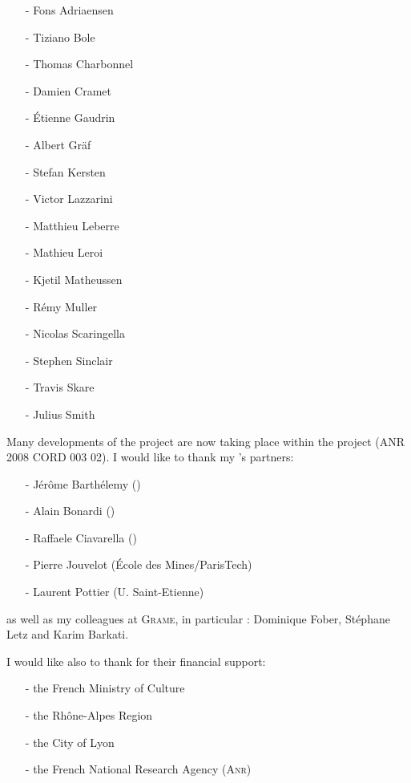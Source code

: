 \documentclass[a4paper,10pt]{book}
\begin{document}
\begin{itemize}

\item[-]Fons Adriaensen	
\item[-]Tiziano Bole	
\item[-]Thomas Charbonnel
\item[-]Damien Cramet
\item[-]\'Etienne Gaudrin
\item[-]Albert Gr\"af
\item[-]Stefan Kersten
\item[-]Victor Lazzarini
\item[-]Matthieu Leberre
\item[-]Mathieu Leroi
\item[-]Kjetil Matheussen
\item[-]R\'emy Muller
\item[-]Nicolas Scaringella
\item[-]Stephen Sinclair
\item[-]Travis Skare
\item[-]Julius Smith
\end{itemize}


Many developments of the \faust project are now taking place within the \astree project (ANR 2008 CORD 003 02). I would like to thank my \astree's partners:
\begin{itemize}
\item[-]J\'er\^ome Barth\'elemy (\ircam)
\item[-]Alain Bonardi (\ircam)
\item[-]Raffaele Ciavarella (\ircam)
\item[-]Pierre Jouvelot (\'Ecole des Mines/ParisTech)
\item[-]Laurent Pottier (U. Saint-Etienne)
\end{itemize}
as well as my colleagues at \textsc{Grame}, in particular : Dominique Fober, St\'ephane Letz and Karim Barkati.


I would like also to thank for their financial support:
\begin{itemize}
\item[-]the French Ministry of Culture
\item[-]the Rh\^one-Alpes Region
\item[-]the City of Lyon
\item[-]the French National Research Agency (\textsc{Anr})
\end{itemize}




\end{document}
